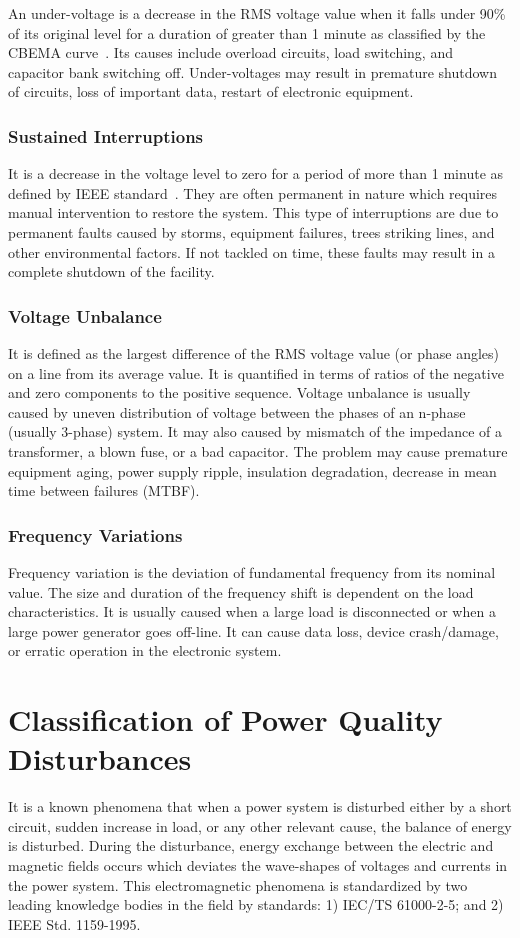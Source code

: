 An under-voltage is a decrease in the RMS voltage value when it falls under 90\% of its original level for a duration of greater than 1 minute as classified by the CBEMA curve~\cite{iti_curve}. Its causes include overload circuits, load switching, and capacitor bank switching off. Under-voltages may result in premature shutdown of circuits, loss of important data, restart of electronic equipment.

\subsubsection{Sustained Interruptions}
It is a decrease in the voltage level to zero for a period of more than 1 minute as defined by IEEE standard~\cite{IEEE09_1159}. They are often permanent in nature which requires manual intervention to restore the system. This type of interruptions are due to permanent faults caused by storms, equipment failures, trees striking lines, and other environmental factors. If not tackled on time, these faults may result in a complete shutdown of the facility.

\subsubsection{Voltage Unbalance}
It is defined as the largest difference of the RMS voltage value (or phase angles) on a line from its average value. It is quantified in terms of ratios of the negative and zero components to the positive sequence. Voltage unbalance is usually caused by uneven distribution of voltage between the phases of an n-phase (usually 3-phase) system. It may also caused by mismatch of the impedance of a transformer, a blown fuse, or a bad capacitor. The problem may cause premature equipment aging, power supply ripple, insulation degradation, decrease in mean time between failures (MTBF).

\subsubsection{Frequency Variations}
Frequency variation is the deviation of fundamental frequency from its nominal value. The size and duration of the frequency shift is dependent on the load characteristics. It is usually caused when a large load is disconnected or when a large power generator goes off-line. It can cause data loss, device crash/damage, or erratic operation in the electronic system.

\section{Classification of Power Quality Disturbances}
\label{PQclassification}
It is a known phenomena that when a power system is disturbed either by a short circuit, sudden increase in load, or any other relevant cause, the balance of energy is disturbed. During the disturbance, energy exchange between the electric and magnetic fields occurs which deviates the wave-shapes of voltages and currents in the power system. This electromagnetic phenomena is standardized by two leading knowledge bodies in the field by standards: 1) IEC/TS 61000-2-5; and 2) IEEE Std. 1159-1995.

